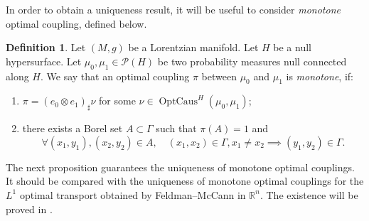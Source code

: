\documentclass[12pt,a4paper]{amsart}
\theoremstyle{plain}
\theoremstyle{definition}
\newtheorem{definition}[lemma]{Definition}
\numberwithin{equation}{section}
\DeclareMathOperator{\OptCaus}{OptCaus}
\newcommand{\Prob}{\mathcal P}
\begin{document}
In order to obtain a uniqueness result, it will be useful to consider \emph{monotone} optimal coupling, defined below.




\begin{definition}\label{def:MonotoneCoupling} Let $(M,g)$ be a Lorentzian manifold.
  Let $H$ be a null hypersurface.
  Let $\mu_0,\mu_1\in \Prob(H)$ be two probability measures null connected
  along $H$.
  We say that an optimal coupling $\pi$ between $\mu_0$ and
  $\mu_1$ is \emph{monotone}, if:
  \begin{enumerate}
  \item 
  $\pi=(e_0\otimes e_1)_{\sharp}\nu$ for some
  $\nu\in\OptCaus^H(\mu_0,\mu_1)$;
  \item there exists a Borel set
  $A\subset\Gamma$ such that $\pi(A)=1$ and
  \begin{equation}
    \forall (x_1,y_1),(x_2,y_2)\in A
    ,
    \quad
    (x_1,x_2)\in\Gamma
    ,
    x_1\neq x_2
    \implies
    (y_1,y_2)\in\Gamma
    .
  \end{equation}
  \end{enumerate}
\end{definition}

The next proposition guarantees the uniqueness of monotone optimal couplings. It should be compared with the uniqueness of monotone optimal couplings for the $L^1$ optimal transport obtained by Feldman--McCann \cite{FeldMc-CVPDE} in $\mathbb{R}^n$.
%
The existence  will be proved in
.
\end{document}
